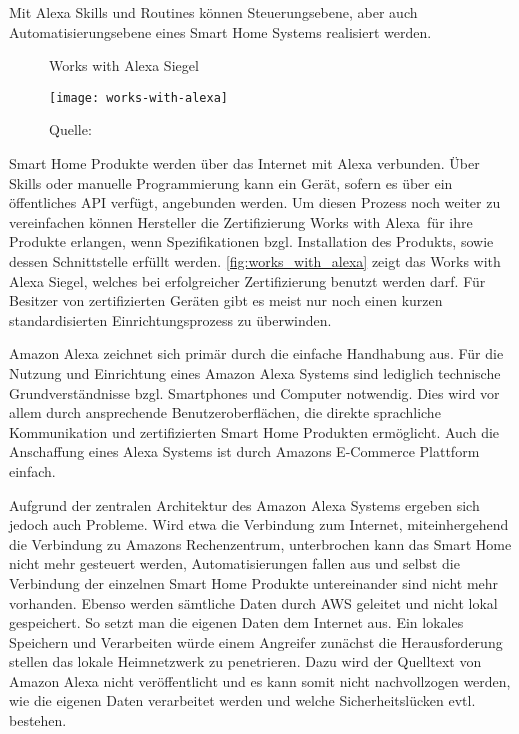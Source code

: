 Mit Alexa Skills und Routines können Steuerungsebene, aber auch Automatisierungsebene eines Smart Home Systems realisiert werden.

\begin{wrapfigure}{r}{0.35\textwidth}
	\centering
	\caption{Works with Alexa Siegel}
	\texttt{[image: works-with-alexa]}
	\caption*{\footnotesize{Quelle: }}
	\label{fig:works_with_alexa}
\end{wrapfigure}

Smart Home Produkte werden über das Internet mit Alexa verbunden.
Über Skills oder manuelle Programmierung kann ein Gerät, sofern es über ein öffentliches \ac{API} verfügt, angebunden werden.
Um diesen Prozess noch weiter zu vereinfachen können Hersteller die Zertifizierung \glqq Works with Alexa\grqq \ für ihre Produkte erlangen, wenn Spezifikationen bzgl. Installation des Produkts, sowie dessen Schnittstelle erfüllt werden.
\autoref{fig:works_with_alexa} zeigt das Works with Alexa Siegel, welches bei erfolgreicher Zertifizierung benutzt werden darf.
Für Besitzer von zertifizierten Geräten gibt es meist nur noch einen kurzen standardisierten Einrichtungsprozess zu überwinden.

Amazon Alexa zeichnet sich primär durch die einfache Handhabung aus.
Für die Nutzung und Einrichtung eines Amazon Alexa Systems sind lediglich technische Grundverständnisse bzgl. Smartphones und Computer notwendig.
Dies wird vor allem durch ansprechende Benutzeroberflächen, die direkte sprachliche Kommunikation und zertifizierten Smart Home Produkten ermöglicht.
Auch die Anschaffung eines Alexa Systems ist durch Amazons E-Commerce Plattform einfach.

Aufgrund der zentralen Architektur des Amazon Alexa Systems ergeben sich jedoch auch Probleme.
Wird etwa die Verbindung zum Internet, miteinhergehend die Verbindung zu Amazons Rechenzentrum, unterbrochen kann das Smart Home nicht mehr gesteuert werden, Automatisierungen fallen aus und selbst die Verbindung der einzelnen Smart Home Produkte untereinander sind nicht mehr vorhanden.
Ebenso werden sämtliche Daten durch \ac{AWS} geleitet und nicht lokal gespeichert.
So setzt man die eigenen Daten dem Internet aus.
Ein lokales Speichern und Verarbeiten würde einem Angreifer zunächst die Herausforderung stellen das lokale Heimnetzwerk zu penetrieren.
Dazu wird der Quelltext von Amazon Alexa nicht veröffentlicht und es kann somit nicht nachvollzogen werden, wie die eigenen Daten verarbeitet werden und welche Sicherheitslücken evtl. bestehen.

